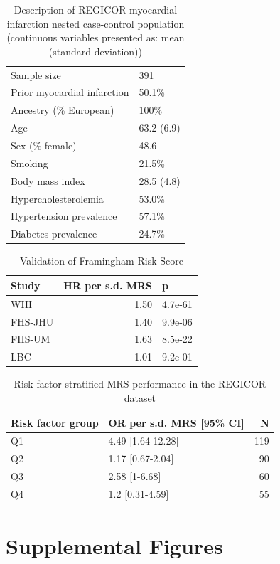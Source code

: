 \documentclass[]{article}
\begin{document}
\begin{longtable}[t]{ll}
\caption{\label{tab:regicor-description}Description of REGICOR myocardial infarction nested case-control population (continuous variables presented as: mean (standard deviation))}\\
\toprule
Sample size & 391\\
Prior myocardial infarction & 50.1\%\\
Ancestry (\% European) & 100\%\\
Age & 63.2 (6.9)\\
Sex (\% female) & 48.6\\
Smoking & 21.5\%\\
Body mass index & 28.5 (4.8)\\
Hypercholesterolemia & 53.0\%\\
Hypertension prevalence & 57.1\%\\
Diabetes prevalence & 24.7\%\\
\bottomrule
\end{longtable}

\begin{longtable}[t]{lrl}
\caption{\label{tab:risk-score-validation}Validation of Framingham Risk Score}\\
\toprule
Study & HR per s.d. MRS & p\\
\midrule
WHI & 1.50 & 4.7e-61\\
FHS-JHU & 1.40 & 9.9e-06\\
FHS-UM & 1.63 & 8.5e-22\\
LBC & 1.01 & 9.2e-01\\
\bottomrule
\end{longtable}

\begin{longtable}[t]{llr}
\caption{\label{tab:regicor-interactions}Risk factor-stratified MRS performance in the REGICOR dataset}\\
\toprule
Risk factor group & OR per s.d. MRS [95\% CI] & N\\
\midrule
Q1 & 4.49 [1.64-12.28] & 119\\
Q2 & 1.17 [0.67-2.04] & 90\\
Q3 & 2.58 [1-6.68] & 60\\
Q4 & 1.2 [0.31-4.59] & 55\\
\bottomrule
\end{longtable}

\newpage

\hypertarget{supplemental-figures}{%
\section{Supplemental Figures}\label{supplemental-figures}}
\end{document}
